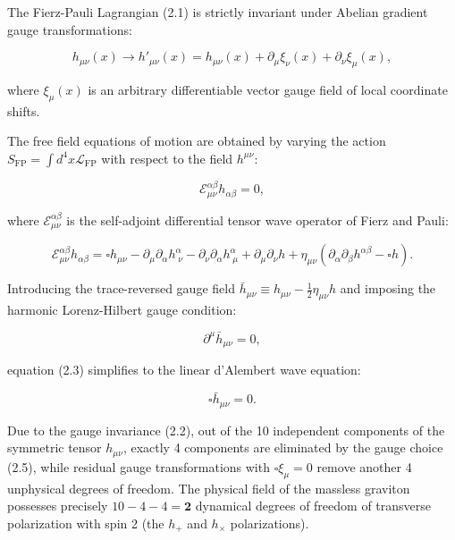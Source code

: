 The Fierz-Pauli Lagrangian (2.1) is strictly invariant under Abelian gradient gauge transformations:

\begin{equation}\label{eq:2.2}\tag{2.2}
h_{\mu\nu}(x) \to h'_{\mu\nu}(x) = h_{\mu\nu}(x) + \partial_\mu \xi_\nu(x) + \partial_\nu \xi_\mu(x),
\end{equation}

where $\xi_\mu(x)$ is an arbitrary differentiable vector gauge field of local coordinate shifts.

The free field equations of motion are obtained by varying the action $S_{\text{FP}} = \int d^4x \mathcal{L}_{\text{FP}}$ with respect to the field $h^{\mu\nu}$:

\begin{equation}\label{eq:2.3}\tag{2.3}
\mathcal{E}_{\mu\nu}^{\alpha\beta} h_{\alpha\beta} = 0,
\end{equation}

where $\mathcal{E}_{\mu\nu}^{\alpha\beta}$ is the self-adjoint differential tensor wave operator of Fierz and Pauli:

\begin{equation}\label{eq:2.4}\tag{2.4}
\mathcal{E}_{\mu\nu}^{\alpha\beta} h_{\alpha\beta} = \square h_{\mu\nu} - \partial_\mu \partial_\alpha h^\alpha_{\;\nu} - \partial_\nu \partial_\alpha h^\alpha_{\;\mu} + \partial_\mu \partial_\nu h + \eta_{\mu\nu} \left( \partial_\alpha \partial_\beta h^{\alpha\beta} - \square h \right).
\end{equation}

Introducing the trace-reversed gauge field $\bar{h}_{\mu\nu} \equiv h_{\mu\nu} - \frac{1}{2}\eta_{\mu\nu} h$ and imposing the harmonic Lorenz-Hilbert gauge condition:

\begin{equation}\label{eq:2.5}\tag{2.5}
\partial^\mu \bar{h}_{\mu\nu} = 0,
\end{equation}

equation (2.3) simplifies to the linear d'Alembert wave equation:

\begin{equation}\label{eq:2.6}\tag{2.6}
\square \bar{h}_{\mu\nu} = 0.
\end{equation}

Due to the gauge invariance (2.2), out of the 10 independent components of the symmetric tensor $h_{\mu\nu}$, exactly 4 components are eliminated by the gauge choice (2.5), while residual gauge transformations with $\square \xi_\mu = 0$ remove another 4 unphysical degrees of freedom. The physical field of the massless graviton possesses precisely $10 - 4 - 4 = \mathbf{2}$ dynamical degrees of freedom of transverse polarization with spin 2 (the $h_+$ and $h_\times$ polarizations).

